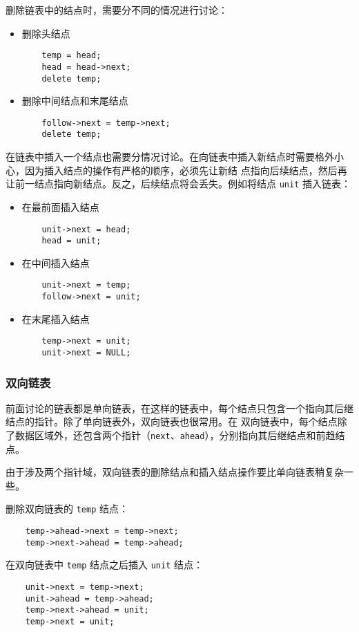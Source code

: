 \documentclass[UTF8]{ctexart}
\begin{document}
删除链表中的结点时，需要分不同的情况进行讨论：
\begin{itemize}
    \item 删除头结点
    \begin{verbatim}
    temp = head;
    head = head->next;
    delete temp;
    \end{verbatim}
    \item 删除中间结点和末尾结点
    \begin{verbatim}
    follow->next = temp->next;
    delete temp;
    \end{verbatim}
\end{itemize}

在链表中插入一个结点也需要分情况讨论。在向链表中插入新结点时需要格外小心，因为插入结点的操作有严格的顺序，必须先让新结
点指向后续结点，然后再让前一结点指向新结点。反之，后续结点将会丢失。例如将结点 \texttt{unit} 插入链表：
\begin{itemize}
    \item 在最前面插入结点
    \begin{verbatim}
    unit->next = head;
    head = unit;
    \end{verbatim}
    \item 在中间插入结点
    \begin{verbatim}
    unit->next = temp;
    follow->next = unit;
    \end{verbatim}
    \item 在末尾插入结点
    \begin{verbatim}
    temp->next = unit;
    unit->next = NULL;
    \end{verbatim}
\end{itemize}

\subsubsection{双向链表}
前面讨论的链表都是单向链表，在这样的链表中，每个结点只包含一个指向其后继结点的指针。除了单向链表外，双向链表也很常用。在
双向链表中，每个结点除了数据区域外，还包含两个指针（\texttt{next}、\texttt{ahead}），分别指向其后继结点和前趋结点。

由于涉及两个指针域，双向链表的删除结点和插入结点操作要比单向链表稍复杂一些。

删除双向链表的 \texttt{temp} 结点：
\begin{verbatim}
    temp->ahead->next = temp->next;
    temp->next->ahead = temp->ahead;
\end{verbatim}

在双向链表中 \texttt{temp} 结点之后插入 \texttt{unit} 结点：
\begin{verbatim}
    unit->next = temp->next;
    unit->ahead = temp->ahead;
    temp->next->ahead = unit;
    temp->next = unit;
\end{verbatim}
\end{document}
